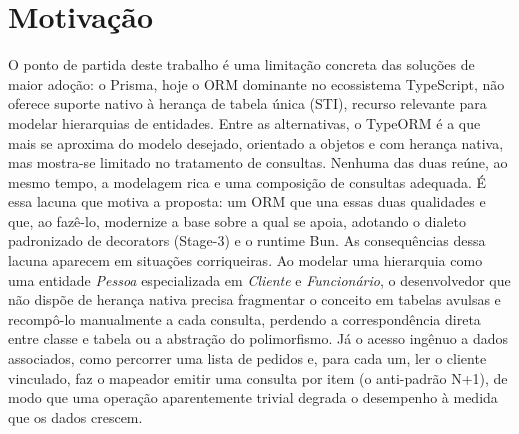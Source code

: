 \newpage
\section{Motivação}
\label{sc:motivacao}

O ponto de partida deste trabalho é uma limitação concreta das soluções de maior adoção: o Prisma, hoje o ORM dominante no ecossistema TypeScript, não oferece suporte nativo à herança de tabela única (STI), recurso relevante para modelar hierarquias de entidades. Entre as alternativas, o TypeORM é a que mais se aproxima do modelo desejado, orientado a objetos e com herança nativa, mas mostra-se limitado no tratamento de consultas. Nenhuma das duas reúne, ao mesmo tempo, a modelagem rica e uma composição de consultas adequada. É essa lacuna que motiva a proposta: um ORM que una essas duas qualidades e que, ao fazê-lo, modernize a base sobre a qual se apoia, adotando o dialeto padronizado de decorators (Stage-3) e o runtime Bun. As consequências dessa lacuna aparecem em situações corriqueiras. Ao modelar uma hierarquia como uma entidade \emph{Pessoa} especializada em \emph{Cliente} e \emph{Funcionário}, o desenvolvedor que não dispõe de herança nativa precisa fragmentar o conceito em tabelas avulsas e recompô-lo manualmente a cada consulta, perdendo a correspondência direta entre classe e tabela ou a abstração do polimorfismo. Já o acesso ingênuo a dados associados, como percorrer uma lista de pedidos e, para cada um, ler o cliente vinculado, faz o mapeador emitir uma consulta por item (o anti-padrão N+1), de modo que uma operação aparentemente trivial degrada o desempenho à medida que os dados crescem.